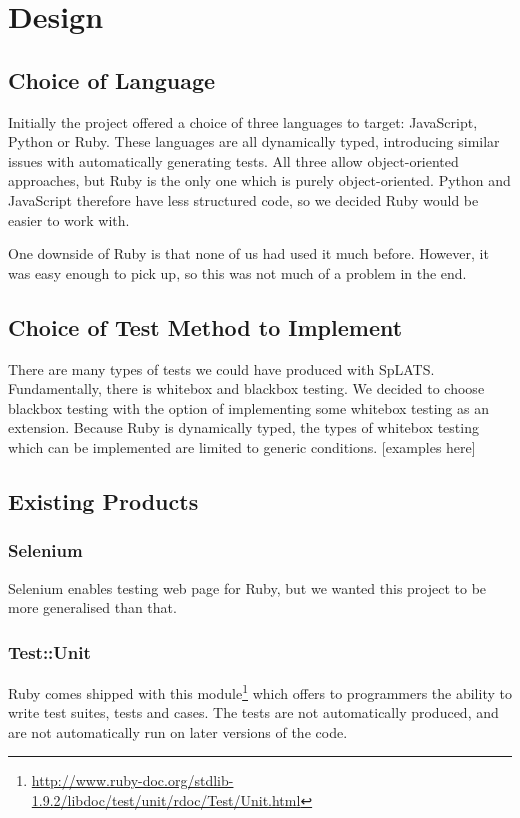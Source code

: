 \chapter{Design}

\section{Choice of Language}
  Initially the project offered a choice of three languages to target: JavaScript, Python or Ruby.
  These languages are all dynamically typed, introducing similar issues with automatically generating tests.
  All three allow object-oriented approaches, but Ruby is the only one which is purely object-oriented.
  Python and JavaScript therefore have less structured code, so we decided Ruby would be easier to work with.

  One downside of Ruby is that none of us had used it much before.
  However, it was easy enough to pick up, so this was not much of a problem in the end.

\section{Choice of Test Method to Implement}
  There are many types of tests we could have produced with SpLATS.
  Fundamentally, there is whitebox and blackbox testing.
  We decided to choose blackbox testing with the option of implementing some whitebox testing as an extension.
  Because Ruby is dynamically typed, the types of whitebox testing which can be implemented are limited to generic conditions.
  [examples here]

\section{Existing Products}
  \subsection{Selenium}
    Selenium enables testing web page for Ruby, but we wanted this project to be more generalised than that.

  \subsection{Test::Unit}
    Ruby comes shipped with this module\footnote{\url{http://www.ruby-doc.org/stdlib-1.9.2/libdoc/test/unit/rdoc/Test/Unit.html}} which offers to programmers the ability to write test suites, tests and cases.
    The tests are not automatically produced, and are not automatically run on later versions of the code.

